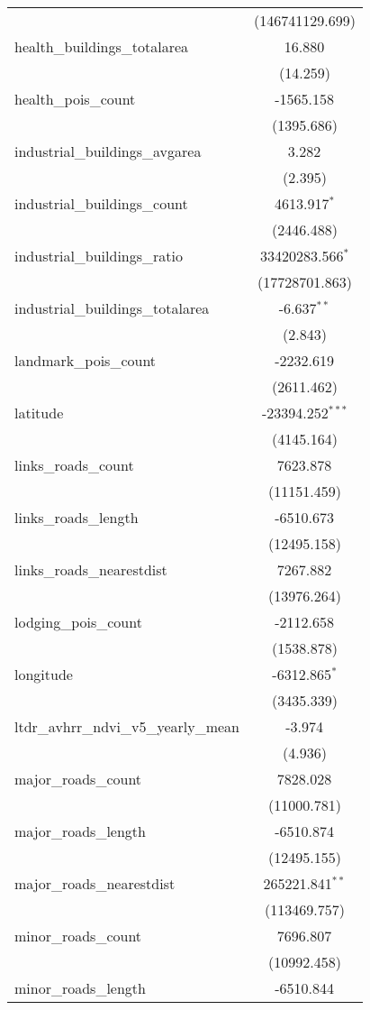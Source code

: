 \begin{table}[!htbp]
\begin{tabular}{@{\extracolsep{5pt}}lc}
  & (146741129.699) \\
 health_buildings_totalarea & 16.880$^{}$ \\
  & (14.259) \\
 health_pois_count & -1565.158$^{}$ \\
  & (1395.686) \\
 industrial_buildings_avgarea & 3.282$^{}$ \\
  & (2.395) \\
 industrial_buildings_count & 4613.917$^{*}$ \\
  & (2446.488) \\
 industrial_buildings_ratio & 33420283.566$^{*}$ \\
  & (17728701.863) \\
 industrial_buildings_totalarea & -6.637$^{**}$ \\
  & (2.843) \\
 landmark_pois_count & -2232.619$^{}$ \\
  & (2611.462) \\
 latitude & -23394.252$^{***}$ \\
  & (4145.164) \\
 links_roads_count & 7623.878$^{}$ \\
  & (11151.459) \\
 links_roads_length & -6510.673$^{}$ \\
  & (12495.158) \\
 links_roads_nearestdist & 7267.882$^{}$ \\
  & (13976.264) \\
 lodging_pois_count & -2112.658$^{}$ \\
  & (1538.878) \\
 longitude & -6312.865$^{*}$ \\
  & (3435.339) \\
 ltdr_avhrr_ndvi_v5_yearly_mean & -3.974$^{}$ \\
  & (4.936) \\
 major_roads_count & 7828.028$^{}$ \\
  & (11000.781) \\
 major_roads_length & -6510.874$^{}$ \\
  & (12495.155) \\
 major_roads_nearestdist & 265221.841$^{**}$ \\
  & (113469.757) \\
 minor_roads_count & 7696.807$^{}$ \\
  & (10992.458) \\
 minor_roads_length & -6510.844$^{}$ \\

\end{tabular}
\end{table}
